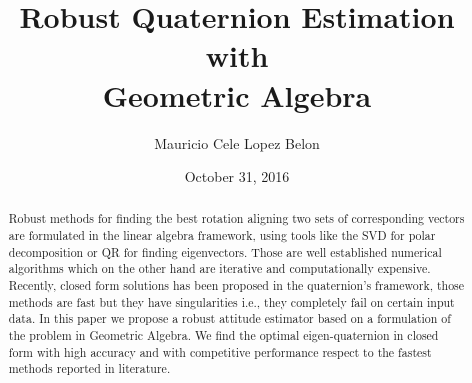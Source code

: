 \documentclass{birkjour}
\numberwithin{equation}{section}
\begin{document}
%
%
%
%
%
%
%
%
%


\title[Robust Quaternion Estimation with Geometric Algebra]
 {Robust Quaternion Estimation with \\Geometric Algebra}

\author[Mauricio Cele Lopez Belon]{Mauricio Cele Lopez Belon}
\address{Madrid, España}



\date{October 31, 2016}

\begin{abstract}

Robust methods for finding the best rotation aligning two sets of corresponding vectors are formulated in the linear algebra framework, using tools like the SVD for polar decomposition or QR for finding eigenvectors. Those are well established numerical algorithms which on the other hand are iterative and computationally expensive. Recently, closed form solutions has been proposed in the quaternion's framework, those methods are fast but they have singularities i.e., they completely fail on certain input data. In this paper we propose a robust attitude estimator based on a formulation of the problem in Geometric Algebra. We find the optimal eigen-quaternion in closed form with high accuracy and with competitive performance respect to the fastest methods reported in literature.

\end{abstract}

\maketitle
\end{document}
